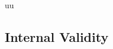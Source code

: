 uu \documentclass[final,twocolumn,5p]{elsarticle}
\newcommand{\bi}{\begin{itemize}[leftmargin=0.4cm]}
\newcommand{\ei}{\end{itemize}}
\newcommand{\tion}[1]{\S\ref{sect:#1}}
\newcommand{\fig}[1]{Figure~\ref{fig:#1}}
\theoremstyle{break}
\begin{document}
\begin{itemize}





\subsection{  Internal Validity}\label{sect:coc}


\end{itemize}
\end{document}
